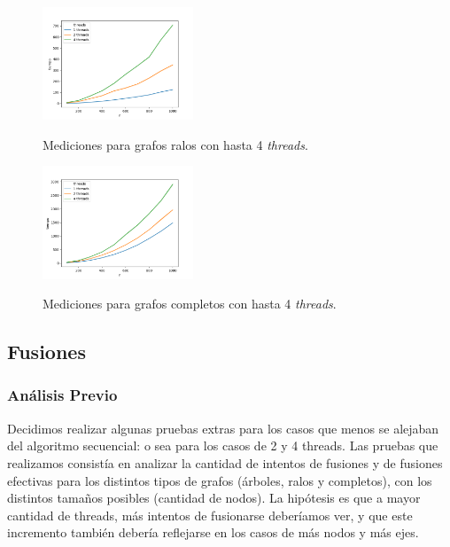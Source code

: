 \begin{figure}[h]
\caption{Mediciones para grafos ralos con hasta 4 \textit{threads}.}
\centering
\includegraphics[width=0.4\textwidth]{imagenes/ralo-124.png} 
\label{fig:ralos124}
\end{figure}

\begin{figure}[h]
\caption{Mediciones para grafos completos con hasta 4 \textit{threads}.}
\centering
\includegraphics[width=0.4\textwidth]{imagenes/completo-124.png} \\
\label{fig:completos124}
\end{figure}

\newpage

\subsection{Fusiones}

\subsubsection{Análisis Previo}

Decidimos realizar algunas pruebas extras para los casos que menos se alejaban 
del algoritmo secuencial: o sea para los casos de 2 y 4 threads. Las pruebas 
que realizamos consistía en analizar la cantidad de intentos de fusiones y de 
fusiones efectivas para los distintos tipos de grafos (árboles, ralos y 
completos), con los distintos tamaños posibles (cantidad de nodos). La 
hipótesis es que a mayor cantidad de threads, más intentos de fusionarse 
deberíamos ver, y que este incremento también debería reflejarse en los casos 
de más nodos y más ejes.


